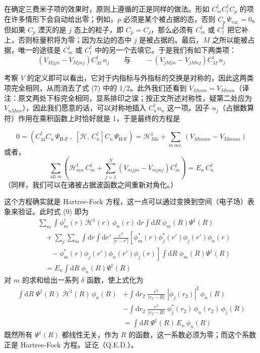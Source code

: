 在确定三费米子项的效果时，原则上遵循的正是同样的做法。形如 $C_m^{\dagger} C_l^{\dagger} C_p$ 的项在许多情形下会自动给出零；例如，$p$ 必须是某个被占据的态，否则 $C_p\,\Psi_{\mathrm{vac}} = 0$。但如果 $C_p$ 湮灭的是 $j$ 态上的粒子，即 $C_p = C_j$，那么必须有 $C_m^{\dagger}$ 或 $C_l^{\dagger}$ 把它补上，否则标量积将为零；因为左边的态中 $j$ 是被占据的。最后，$M$ 之所以能被占据，唯一的途径是 $C_m^{\dagger}$ 或 $C_l^{\dagger}$ 中的另一个去填它。于是我们有如下两类项：
\begin{equation*}
\left(V_{Mjjn} - V_{Mjnj}\right) C_M^{\dagger}\, n_j \qquad\text{与}\qquad -\left(V_{jMjn} - V_{jMnj}\right) C_M^{\dagger}\, n_j
\end{equation*}

考察 $V$ 的定义即可以看出，它对于内指标与外指标的交换是对称的，因此这两类项完全相同，从而消去了式 (7) 中的 1/2。此外我们还看到 $V_{Mnnn} = V_{Mnnn}$（译注：原文两处下标完全相同，显系排印之误；按正文所述对称性，疑第二处应为 $V_{nMnn}$），因此我们愿意的话，可以对称地插入 $C_n^{\dagger} n_n$ 这一项。因子 $n_j$（占据数算符）作用在乘积函数上时恰好就是 1，于是最终的方程是

\begin{equation*}
0 = \left(C_M^{\dagger} C_n\,\Psi_{\text{H-F}}\,,\; \left[\mathcal{H},\, C_n^{\dagger}\right] C_n\,\Psi_{\text{H-F}}\right) = \mathcal{H}^1_{Mn} + \sum_{m\ \text{occ.}}\left(V_{Mmmn} - V_{Mmnm}\right)
\end{equation*}
或者，
\begin{equation*}
\sum_{\text{all }m}\left(\mathcal{H}^1_{mn}\, C_m^{\dagger} + \sum_{j=1}^{N}\left(V_{mjjn} - V_{mjnj}\right)C_m^{\dagger}\right) = E_n\, C_n^{\dagger}
\tag{9}
\end{equation*}
（同样，我们可以在诸被占据波函数之间重新对角化。）

这个方程确实就是 Hartree-Fock 方程，这一点可以通过变换到空间（电子场）表象来验证。此时式 (9) 即为
\begin{align*}
&\sum_m \int \phi_m^{\dagger}(r)\,\mathcal{H}^1(r)\,\phi_n(r)\,\mathrm{d}r \int \mathrm{d}R\;\phi_m(R)\Psi^{\dagger}(R) \\
&\quad+\sum_j\sum_m \int \mathrm{d}r \int \mathrm{d}r'\;\frac{e^2}{|r-r'|}\left[\phi_m^{*}(r)\phi_j^{*}(r')\phi_j(r')\phi_n(r)\right.\\
&\qquad\left.-\;\phi_m^{*}(r)\phi_j(r')\phi_n(r')\phi_j(r)\right]\int \mathrm{d}R\;\phi_m(R)\Psi^{\dagger}(R)\\
&\quad=E_n \int \mathrm{d}R\;\phi_n(R)\Psi^{\dagger}(R)
\end{align*}
对 $m$ 的求和给出一系列 $\delta$ 函数，使上式化为
\begin{align*}
\int \mathrm{d}R\;\Psi^{\dagger}(R)\;\mathcal{H}^1(R)\,\phi_n(R) &+ \int \mathrm{d}r_2\;\frac{e^2}{|r_2-R|}\;|\phi_j(r_2)|^2\,\phi_n(R) \\
&- \int \mathrm{d}r_2\;\frac{e^2}{|r_2-R|}\;\phi_j^{*}(r_2)\,\phi_n(r_2)\,\phi_j(R) \\
&= \int \mathrm{d}R\;\Psi^{\dagger}(R)\,E_n\,\phi_n(R)
\end{align*}
既然所有 $\Psi^{\dagger}(R)$ 都线性无关，作为 $R$ 的函数，这一系数必须为零；而这个系数正是 Hartree-Fock 方程。证讫（Q.E.D.）。

